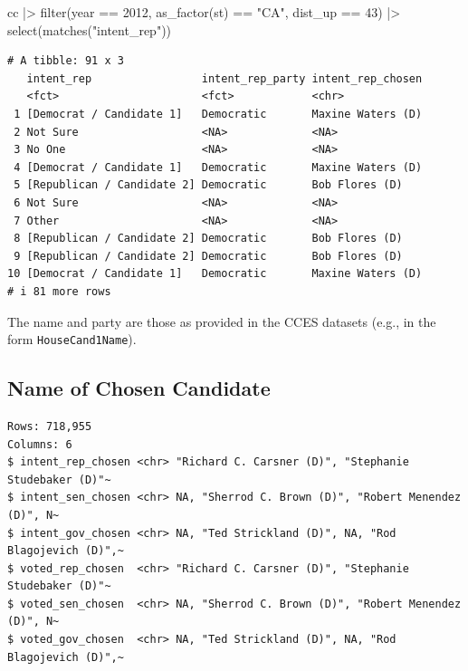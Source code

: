 \documentclass[10pt,article,oneside]{memoir}
\newenvironment{Shaded}{\begin{snugshade}}{\end{snugshade}}
\newcommand{\DecValTok}[1]{\textcolor[rgb]{0.68,0.00,0.00}{#1}}
\newcommand{\FunctionTok}[1]{\textcolor[rgb]{0.28,0.35,0.67}{#1}}
\newcommand{\NormalTok}[1]{\textcolor[rgb]{0.00,0.23,0.31}{#1}}
\newcommand{\SpecialCharTok}[1]{\textcolor[rgb]{0.37,0.37,0.37}{#1}}
\newcommand{\StringTok}[1]{\textcolor[rgb]{0.13,0.47,0.30}{#1}}
\begin{document}
\begin{Shaded}
\begin{Highlighting}[]
\NormalTok{cc }\SpecialCharTok{|\textgreater{}} 
  \FunctionTok{filter}\NormalTok{(year }\SpecialCharTok{==} \DecValTok{2012}\NormalTok{, }\FunctionTok{as\_factor}\NormalTok{(st) }\SpecialCharTok{==} \StringTok{"CA"}\NormalTok{, dist\_up }\SpecialCharTok{==} \DecValTok{43}\NormalTok{) }\SpecialCharTok{|\textgreater{}} 
  \FunctionTok{select}\NormalTok{(}\FunctionTok{matches}\NormalTok{(}\StringTok{"intent\_rep"}\NormalTok{)) }
\end{Highlighting}
\end{Shaded}

\begin{verbatim}
# A tibble: 91 x 3
   intent_rep                 intent_rep_party intent_rep_chosen
   <fct>                      <fct>            <chr>            
 1 [Democrat / Candidate 1]   Democratic       Maxine Waters (D)
 2 Not Sure                   <NA>             <NA>             
 3 No One                     <NA>             <NA>             
 4 [Democrat / Candidate 1]   Democratic       Maxine Waters (D)
 5 [Republican / Candidate 2] Democratic       Bob Flores (D)   
 6 Not Sure                   <NA>             <NA>             
 7 Other                      <NA>             <NA>             
 8 [Republican / Candidate 2] Democratic       Bob Flores (D)   
 9 [Republican / Candidate 2] Democratic       Bob Flores (D)   
10 [Democrat / Candidate 1]   Democratic       Maxine Waters (D)
# i 81 more rows
\end{verbatim}

The name and party are those as provided in the CCES datasets (e.g., in
the form \texttt{HouseCand1Name}).

\subsection{Name of Chosen Candidate}\label{name-of-chosen-candidate}

\begin{verbatim}
Rows: 718,955
Columns: 6
$ intent_rep_chosen <chr> "Richard C. Carsner (D)", "Stephanie Studebaker (D)"~
$ intent_sen_chosen <chr> NA, "Sherrod C. Brown (D)", "Robert Menendez (D)", N~
$ intent_gov_chosen <chr> NA, "Ted Strickland (D)", NA, "Rod Blagojevich (D)",~
$ voted_rep_chosen  <chr> "Richard C. Carsner (D)", "Stephanie Studebaker (D)"~
$ voted_sen_chosen  <chr> NA, "Sherrod C. Brown (D)", "Robert Menendez (D)", N~
$ voted_gov_chosen  <chr> NA, "Ted Strickland (D)", NA, "Rod Blagojevich (D)",~
\end{verbatim}
\end{document}
